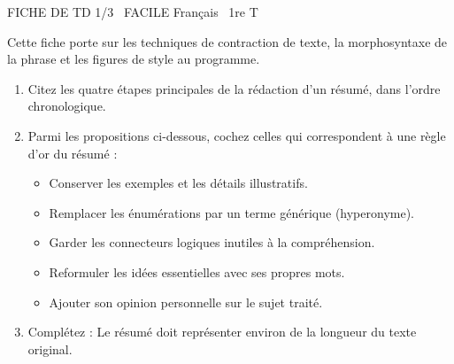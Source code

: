 \documentclass[11pt]{article}
\begin{document}
\begin{tcolorbox}[enhanced,colback=popink,colframe=popink,arc=10pt,boxrule=0pt,left=12pt,right=12pt,top=9pt,bottom=9pt]
{\color{white}\popxbold\small FICHE DE TD 1/3 \textbullet\ FACILE \hfill Français \textbullet\ 1re T\par}
\end{tcolorbox}
\vspace{4pt}
Cette fiche porte sur les techniques de contraction de texte, la morphosyntaxe de la phrase et les figures de style au programme.

\begin{exercice}
\begin{enumerate}
    \item Citez les quatre étapes principales de la rédaction d'un résumé, dans l'ordre chronologique.
    \item Parmi les propositions ci-dessous, cochez celles qui correspondent à une règle d'or du résumé :
    \begin{itemize}
        \item[$\square$] Conserver les exemples et les détails illustratifs.
        \item[$\square$] Remplacer les énumérations par un terme générique (hyperonyme).
        \item[$\square$] Garder les connecteurs logiques inutiles à la compréhension.
        \item[$\square$] Reformuler les idées essentielles avec ses propres mots.
        \item[$\square$] Ajouter son opinion personnelle sur le sujet traité.
    \end{itemize}
    \item Complétez : Le résumé doit représenter environ \underline{\hspace{3cm}} de la longueur du texte original.
\end{enumerate}
\end{exercice}
\end{document}
